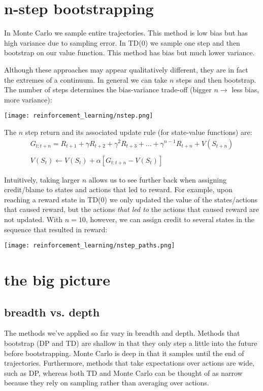 \section{n-step bootstrapping}
In Monte Carlo we sample entire trajectories. This method is low bias but has high variance due to sampling error. In TD(0) we sample one step and then bootstrap on our value function. This method has bias but much lower variance.

Although these approaches may appear qualitatively different, they are in fact the extremes of a continuum. In general we can take $n$ steps and then bootstrap. The number of steps determines the bias-variance trade-off (bigger $n \rightarrow$ less bias, more variance):

\begin{center}\texttt{[image: reinforcement\_learning/nstep.png]}\end{center}

The $n$ step return and its associated update rule (for state-value functions) are:
\begin{gather*}
G_{t:t+n} = R_{t+1} + \gamma  R_{t+2} + \gamma^2  R_{t+3} + \dots + \gamma^{n-1}  R_{t+n} + V(S_{t+n}) \\ \\
V(S_t) \leftarrow V(S_t) + \alpha [G_{t:t+n} - V(S_t)]
\end{gather*}

Intuitively, taking larger $n$ allows us to see further back when assigning credit/blame to states and actions that led to reward. For example, upon reaching a reward state in TD(0) we only updated the value of the states/actions that caused reward, but the actions \textit{that led to} the actions that caused reward are not updated. With $n=10$, however, we can assign credit to several states in the sequence that resulted in reward:

\begin{center}\texttt{[image: reinforcement\_learning/nstep\_paths.png]}\end{center}

\section{the big picture}
\subsection{breadth vs. depth}
The methods we've applied so far vary in breadth and depth. Methods that bootstrap (DP and TD) are shallow in that they only step a little into the future before bootstrapping. Monte Carlo is deep in that it samples until the end of trajectories. Furthermore, methods that take expectations over actions are wide, such as DP, whereas both TD and Monte Carlo can be thought of as narrow because they rely on sampling rather than averaging over actions. 

